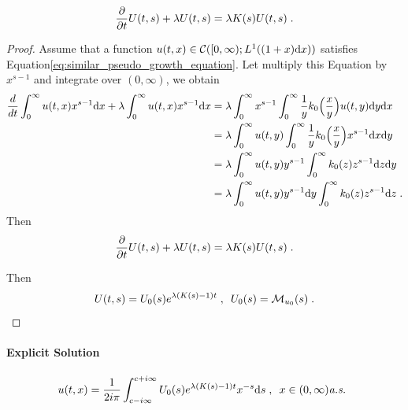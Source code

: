 \documentclass[11pt]{amsart}
\begin{document}
\begin{theorem}
	\begin{equation*}
		\frac{\partial}{\partial t} U(t,s) + \lambda U(t,s) = \lambda K(s) U(t,s)
		\; .
	\end{equation*}
\end{theorem}
\begin{proof}
	Assume that a function $u(t, x) \in \mathcal{C}([0, \infty); L^1((1+x)\mathrm dx))$ satisfies Equation\eqref{eq:similar_pseudo_growth_equation}. Let multiply this Equation by $x^{s-1}$ and integrate over $(0, \infty)$, we obtain
	    \begin{align*}
    	   \frac{d}{dt} \int_0^\infty u(t,x) x^{s-1} \mathrm dx
    	   + 
    	   \lambda \int_0^\infty u(t,x)x^{s-1} \mathrm dx
    	   &= 
    	   \lambda \int_0^\infty x^{s-1} \int_{0}^{\infty} \frac{1}{y} k_0 \Big(\frac{x}{y} \Big) u(t,y) \mathrm dy \mathrm dx \\
	       &= 
	       \lambda \int_0^\infty  u(t,y) \int_{0}^{\infty} \frac{1}{y} k_0 \Big(\frac{x}{y} \Big) x^{s-1} \mathrm dx \mathrm dy 	   \\
	       &= 
	       \lambda \int_0^\infty  u(t,y) y^{s-1}  \int_{0}^{\infty} k_0(z) z^{s-1} \mathrm dz \mathrm dy	   \\
	       &= \lambda \int_0^\infty  u(t,y) y^{s-1} \mathrm dy  \int_{0}^{\infty} k_0(z) z^{s-1} \mathrm dz
	       \; .
	    \end{align*}
Then 
	\begin{equation*}
		\frac{\partial}{\partial t} U(t,s) + \lambda U(t,s) = \lambda K(s) U(t,s)
		\; .
	\end{equation*}
	
Then 
    \begin{equation*}
        U(t,s) = U_0(s) e^{\lambda(K(s) - 1) t}
        \; , \enspace
        U_0(s) = \mathcal{M}_{u_0}(s)
        \; .
    \end{equation*}
\end{proof}

\paragraph{Explicit Solution}

\begin{equation}
    u(t,x) = \frac{1}{2i\pi} \int_{c - i \infty}^{c + i \infty} U_0(s) e^{\lambda(K(s) - 1) t} x^{-s}\mathrm ds 
    \; , \enspace x \in (0, \infty) \textit{a.s. }
    \label{eq:explicit_reconstruction}
\end{equation}
\end{document}
